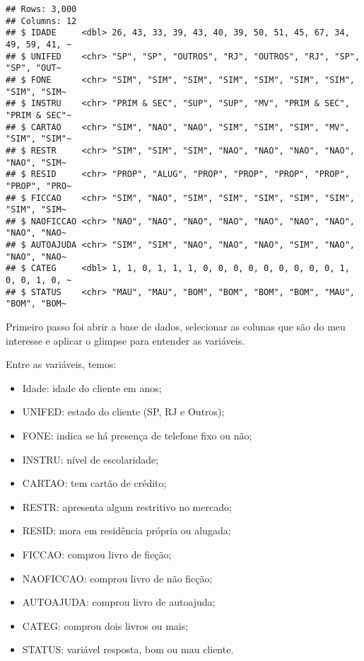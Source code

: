 \documentclass[
]{book}
\providecommand{\tightlist}{%
  \setlength{\itemsep}{0pt}\setlength{\parskip}{0pt}}
\begin{document}
\begin{verbatim}
## Rows: 3,000
## Columns: 12
## $ IDADE     <dbl> 26, 43, 33, 39, 43, 40, 39, 50, 51, 45, 67, 34, 49, 59, 41, ~
## $ UNIFED    <chr> "SP", "SP", "OUTROS", "RJ", "OUTROS", "RJ", "SP", "SP", "OUT~
## $ FONE      <chr> "SIM", "SIM", "SIM", "SIM", "SIM", "SIM", "SIM", "SIM", "SIM~
## $ INSTRU    <chr> "PRIM & SEC", "SUP", "SUP", "MV", "PRIM & SEC", "PRIM & SEC"~
## $ CARTAO    <chr> "SIM", "NAO", "NAO", "SIM", "SIM", "SIM", "MV", "SIM", "SIM"~
## $ RESTR     <chr> "SIM", "SIM", "SIM", "NAO", "NAO", "NAO", "NAO", "NAO", "SIM~
## $ RESID     <chr> "PROP", "ALUG", "PROP", "PROP", "PROP", "PROP", "PROP", "PRO~
## $ FICCAO    <chr> "SIM", "NAO", "SIM", "SIM", "SIM", "SIM", "SIM", "SIM", "SIM~
## $ NAOFICCAO <chr> "NAO", "NAO", "NAO", "NAO", "NAO", "NAO", "NAO", "NAO", "NAO~
## $ AUTOAJUDA <chr> "SIM", "SIM", "NAO", "NAO", "NAO", "SIM", "NAO", "NAO", "NAO~
## $ CATEG     <dbl> 1, 1, 0, 1, 1, 1, 0, 0, 0, 0, 0, 0, 0, 0, 0, 1, 0, 0, 1, 0, ~
## $ STATUS    <chr> "MAU", "MAU", "BOM", "BOM", "BOM", "BOM", "MAU", "BOM", "BOM~
\end{verbatim}

Primeiro passo foi abrir a base de dados, selecionar as colunas que são do meu interesse e aplicar o glimpse para entender as variáveis.

Entre as variáveis, temos:

\begin{itemize}
\tightlist
\item
  Idade: idade do cliente em anos;
\item
  UNIFED: estado do cliente (SP, RJ e Outros);
\item
  FONE: indica se há presença de telefone fixo ou não;
\item
  INSTRU: nível de escolaridade;
\item
  CARTAO: tem cartão de crédito;
\item
  RESTR: apresenta algum restritivo no mercado;
\item
  RESID: mora em residência própria ou alugada;
\item
  FICCAO: comprou livro de ficção;
\item
  NAOFICCAO: comprou livro de não ficção;
\item
  AUTOAJUDA: comprou livro de autoajuda;
\item
  CATEG: comprou dois livros ou mais;
\item
  STATUS: variável resposta, bom ou mau cliente.
\end{itemize}
\end{document}
